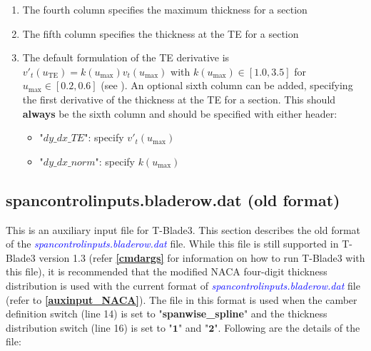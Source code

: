 \documentclass[8pt]{article}
\begin{document}
\begin{itemize}[leftmargin=*]
\begin{enumerate}[label=\alph*]
        \item The fourth column specifies the maximum thickness for a section
        \item The fifth column specifies the thickness at the TE for a section
      \item The default formulation of the TE derivative is $v'_{t}(u_{\text{TE}}) = k(u_{\text{max}})v_{t}(u_{\text{max}})$ with $k(u_{\text{max}}) \in [1.0,3.5]$ for $u_{\text{max}} \in [0.2,0.6]$ (see \cite{AbbottText}). An optional sixth column can be added, specifying the first derivative of the thickness at the TE for a section. This should \textbf{always} be the sixth column and should be specified with either header:
      \begin{itemize}[label=\FilledSmallSquare]
          \item "$dy\_dx\_TE$": specify $v'_{t}(u_{\text{max}})$
          \item "$dy\_dx\_norm$": specify $k(u_{\text{max}})$
      \end{itemize}
    \end{enumerate}
\end{itemize}

\subsection{spancontrolinputs.bladerow.dat (old format)}\label{auxinput1}
\noindent
This is an auxiliary input file for T-Blade3. This section describes the old format of the \textit{\textcolor{blue}{spancontrolinputs.bladerow.dat}} file. While this file is still supported in T-Blade3 version 1.3 (refer \textbf{\ref{cmdargs}} for information on how to run T-Blade3 with this file), it is recommended that the modified NACA four-digit thickness distribution is used with the current format of \textit{\textcolor{blue}{spancontrolinputs.bladerow.dat}} file (refer to \textbf{\ref{auxinput_NACA}}). The file in this format is used when the camber definition switch (line 14) is set to "\textbf{spanwise\_spline}" and the thickness distribution switch (line 16) is set to "$\mathbf{1}$" and "$\mathbf{2}$". Following are the details of the file:
\end{document}
